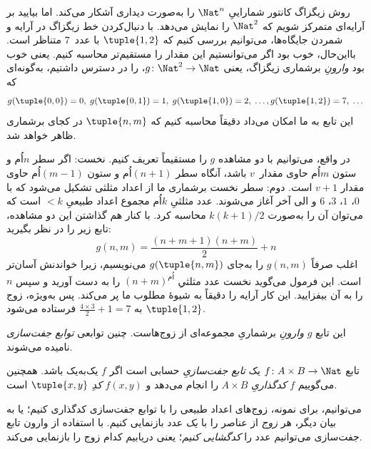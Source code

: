 \documentclass[../../../include/open-logic-section]{subfiles}
\begin{document}

\begin{explain}
روش زیگزاگ کانتور شماراییِ $\Nat^n$ را به‌صورت دیداری آشکار می‌کند. اما
بیایید بر آرایه‌ای متمرکز شویم که $\Nat^2$ را نمایش می‌دهد. با دنبال‌کردن
خط زیگزاگ در آرایه و شمردن جایگاه‌ها، می‌توانیم بررسی کنیم که
$\tuple{1,2}$ با عدد~$7$ متناظر است. بااین‌حال، خوب بود اگر می‌توانستیم
این مقدار را مستقیم‌تر محاسبه کنیم. یعنی خوب بود \emph{وارونِ} برشماری
زیگزاگ، یعنی $g\colon \Nat^2 \to \Nat$، را در دسترس داشتیم، به‌گونه‌ای که
\[
g(\tuple{0,0}) = 0, \;
g(\tuple{0,1}) = 1, \;
g(\tuple{1,0}) = 2, \; \dots,
g(\tuple{1,2}) = 7, \; \dots
\]
این تابع به ما امکان می‌داد دقیقاً محاسبه کنیم که $\tuple{n, m}$ در کجای
برشماری ظاهر خواهد شد.

در واقع، می‌توانیم با دو مشاهده $g$ را مستقیماً تعریف کنیم. نخست: اگر
سطر $n$اُم و ستون $m$اُم حاوی مقدار~$v$ باشد، آنگاه سطر
$(n+1)$اُم و ستون $(m-1)$اُم حاوی مقدار $v + 1$ است. دوم: سطر نخست
برشماری ما از اعداد مثلثی تشکیل می‌شود که با $0$، $1$، $3$، $6$ و
الی آخر آغاز می‌شوند. عدد مثلثیِ $k$اُم مجموع اعداد طبیعیِ $< k$ است
که می‌توان آن را به‌صورت $k(k+1)/2$ محاسبه کرد. با کنار هم گذاشتن این
دو مشاهده، تابع زیر را در نظر بگیرید:
\[
  g(n,m) = \frac{(n+m+1)(n+m)}{2} + n
\]
اغلب صرفاً $g(n, m)$ را به‌جای $g(\tuple{n, m})$ می‌نویسیم، زیرا خواندنش
آسان‌تر است. این فرمول می‌گوید نخست عدد مثلثیِ $(n+m)^\text{اُم}$ را
به دست آورید و سپس $n$ را به آن بیفزایید. این کار آرایه را دقیقاً به
شیوهٔ مطلوب ما پر می‌کند. پس به‌ویژه، زوج $\tuple{1, 2}$ به
$\frac{4 \times 3}{2} +
1 = 7$ فرستاده می‌شود.

این تابع $g$ \emph{وارونِ} برشماریِ مجموعه‌ای از زوج‌هاست. چنین توابعی
\emph{توابع جفت‌سازی} نامیده می‌شوند.
\end{explain}

\begin{defn}
  تابع $f\colon A \times B \to \Nat$ یک \emph{تابع جفت‌سازیِ} حسابی است
  اگر $f$ یک‌به‌یک باشد. همچنین می‌گوییم $f$ \emph{کدگذاریِ}
  $A \times B$ را انجام می‌دهد و $f(x,y)$ \emph{کدِ} $\tuple{x,y}$ است.
\end{defn}

\begin{explain}
می‌توانیم، برای نمونه، زوج‌های اعداد طبیعی را با توابع جفت‌سازی
کدگذاری کنیم؛ یا به بیان دیگر، هر \emph{زوج} از عناصر را با
\emph{یک} عدد بازنمایی کنیم. با استفاده از وارون تابع جفت‌سازی می‌توانیم
عدد را \emph{کدگشایی کنیم}؛ یعنی دریابیم کدام زوج را بازنمایی می‌کند.
\end{explain}
\end{document}
